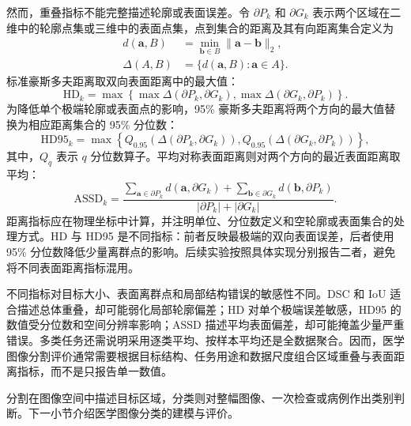 然而，重叠指标不能完整描述轮廓或表面误差。令 $\partial P_k$ 和 $\partial G_k$ 表示两个区域在二维中的轮廓点集或三维中的表面点集，点到集合的距离及其有向距离集合定义为
\begin{equation}
\begin{aligned}
d(\mathbf{a},B)
&=\min_{\mathbf{b}\in B}\lVert\mathbf{a}-\mathbf{b}\rVert_2,\\
\Delta(A,B)
&=\{d(\mathbf{a},B):\mathbf{a}\in A\}.
\end{aligned}
\label{eq:foundations-seg-directed-distance}
\end{equation}
标准豪斯多夫距离取双向表面距离中的最大值\cite{taha2015metrics}：
\begin{equation}
\mathrm{HD}_k
=
\max\left\{
\max\Delta(\partial P_k,\partial G_k),
\max\Delta(\partial G_k,\partial P_k)
\right\}.
\label{eq:foundations-seg-hd}
\end{equation}
为降低单个极端轮廓或表面点的影响，95\% 豪斯多夫距离将两个方向的最大值替换为相应距离集合的 95\% 分位数：
\begin{equation}
\mathrm{HD95}_k
=
\max\left\{
Q_{0.95}\!\left(\Delta(\partial P_k,\partial G_k)\right),
Q_{0.95}\!\left(\Delta(\partial G_k,\partial P_k)\right)
\right\},
\label{eq:foundations-seg-hd95}
\end{equation}
其中，$Q_q$ 表示 $q$ 分位数算子。平均对称表面距离则对两个方向的最近表面距离取平均：
\begin{equation}
\mathrm{ASSD}_k
=
\frac{
\sum_{\mathbf{a}\in\partial P_k}d(\mathbf{a},\partial G_k)
+
\sum_{\mathbf{b}\in\partial G_k}d(\mathbf{b},\partial P_k)}
{|\partial P_k|+|\partial G_k|}.
\label{eq:foundations-seg-assd}
\end{equation}
距离指标应在物理坐标中计算，并注明单位、分位数定义和空轮廓或表面集合的处理方式。HD 与 HD95 是不同指标：前者反映最极端的双向表面误差，后者使用 95\% 分位数降低少量离群点的影响。后续实验按照具体实现分别报告二者，避免将不同表面距离指标混用。

不同指标对目标大小、表面离群点和局部结构错误的敏感性不同\cite{taha2015metrics}。DSC 和 IoU 适合描述总体重叠，却可能弱化局部轮廓偏差；HD 对单个极端误差敏感，HD95 的数值受分位数和空间分辨率影响；ASSD 描述平均表面偏差，却可能掩盖少量严重错误。多类任务还需说明采用逐类平均、按样本平均还是全数据聚合。因而，医学图像分割评价通常需要根据目标结构、任务用途和数据尺度组合区域重叠与表面距离指标，而不是只报告单一数值。

分割在图像空间中描述目标区域，分类则对整幅图像、一次检查或病例作出类别判断。下一小节介绍医学图像分类的建模与评价。

